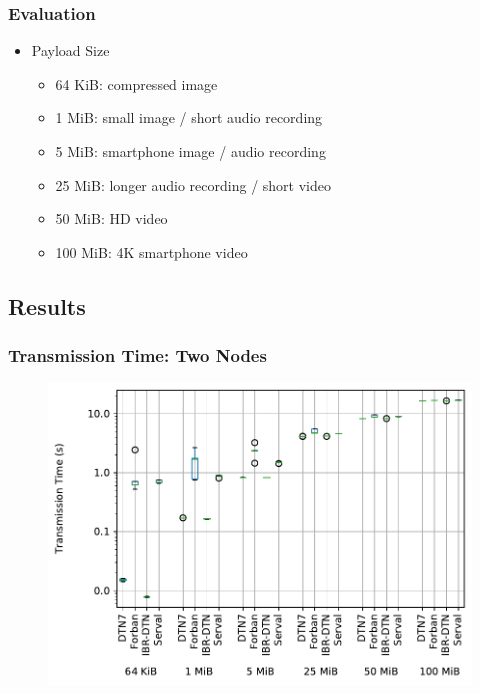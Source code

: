 \begin{frame}
  \frametitle{Evaluation}

  \begin{itemize}
  \item Payload Size
  \begin{itemize}
    \item 64 KiB: compressed image
    \item 1 MiB: small image / short audio recording
    \item 5 MiB: smartphone image / audio recording
    \item 25 MiB: longer audio recording / short video
    \item 50 MiB: HD video
    \item 100 MiB: 4K smartphone video
  \end{itemize}
  \end{itemize}
\end{frame}

\subsection{Results}

\begin{frame}
  \frametitle{Transmission Time: Two Nodes}

  \begin{figure}
    \includegraphics[width=0.8\linewidth,keepaspectratio]{include/chain-runtimes-2}
  \end{figure}
\end{frame}

